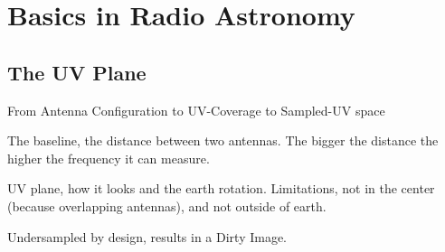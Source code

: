 \section{Basics in Radio Astronomy} \label{radio}

\subsection{The UV Plane}

From Antenna Configuration to UV-Coverage to Sampled-UV space

The baseline, the distance between two antennas. The bigger the distance the higher the frequency it can measure.

UV plane, how it looks and the earth rotation. Limitations, not in the center (because overlapping antennas), and not outside of earth.

Undersampled by design, results in a Dirty Image.